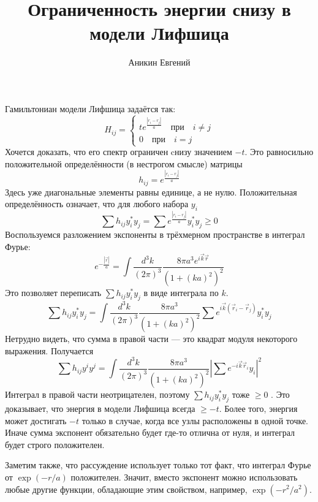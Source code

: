 \documentclass{article}
\title{Ограниченность энергии снизу в модели Лифшица}
\author{Аникин Евгений}
\begin{document}
\maketitle
    Гамильтониан модели Лифшица задаётся так:
    \begin{equation}
        H_{ij} = \left\{\begin{matrix}
                    t e^{\frac{|r_i - r_j|}{a}} \quad \text{при} \quad i\ne j \\
                    0 \quad \text{при} \quad i = j
                 \end{matrix}\right.
    \end{equation}
    Хочется доказать, что его спектр ограничен cнизу значением $-t$. 
    Это равносильно положительной 
    определённости (в нестрогом смысле) матрицы
    \begin{equation}
        h_{ij} = e^{\frac{|r_i - r_j|}{a}}
    \end{equation}
    Здесь уже диагональные элементы равны единице, а не нулю. 
    Положительная определённость означает,
    что для любого набора $y_i$ 
    \begin{equation}
        \sum h_{ij} y_i^* y_j = \sum e^{\frac{|r_i - r_j|}{a}} y_i^* y_j \ge 0
    \end{equation}
    Воспользуемся разложением экспоненты в трёхмерном пространстве в интеграл Фурье:
    \begin{equation}
        e^{-\frac{|\vec{r}|}{a}} = \int \frac{d^3 k}{(2\pi)^3} 
                            \frac{8\pi a^3 e^{i\vec{k}\vec{r}}}{(1 + (ka)^2)^2}
    \end{equation} 
    Это позволяет переписать $\sum h_{ij} y_i^* y_j$ в виде интеграла по $k$.
    \begin{equation}
        \sum h_{ij} y_i^* y_j = \int \frac{d^3 k}{(2\pi)^3} 
                           \frac{8\pi a^3}{(1 + (ka)^2)^2}
                            \sum e^{i\vec{k}(\vec{r}_i - \vec{r}_j)} y_i^* y_j
    \end{equation}
    Нетрудно видеть, что сумма в правой части --- это квадрат модуля некоторого выражения.
    Получается
    \begin{equation}
        \sum h_{ij} y^i y^j = \int \frac{d^3 k}{(2\pi)^3} 
                            \frac{8\pi a^3}{(1 + (ka)^2)^2}
                            \left| \sum e^{-i\vec{k} \vec{r}_i} y_i \right|^2
    \end{equation}
    Интеграл в правой части неотрицателен, поэтому $\sum h_{ij} y_i^* y_j$ тоже $\ge 0$  
    . Это доказывает, что энергия в модели Лифшица всегда $\ge -t$. Более того, энергия 
    может достигать $-t$ только в случае, когда все узлы расположены в одной точке. Иначе 
    сумма экспонент обязательно будет где-то отлична от нуля, и интеграл будет строго
    положителен.
    
    Заметим также, что рассуждение использует только тот факт, что интеграл Фурье от
    $\exp{(-r/a)}$ положителен. Значит, вместо экспонент можно использовать любые другие 
    функции, обладающие этим свойством, например, $\exp{(-r^2/a^2)}$.
\end{document}
